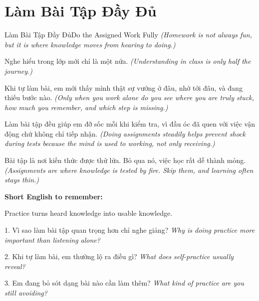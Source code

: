 \section{Làm Bài Tập Đầy Đủ}
\begin{truyen}{Làm Bài Tập Đầy Đủ}{Do the Assigned Work Fully}
\textit{(Homework is not always fun, but it is where knowledge moves from hearing to doing.)}

Nghe hiểu trong lớp mới chỉ là một nửa.
\textit{(Understanding in class is only half the journey.)}

Khi tự làm bài, em mới thấy mình thật sự vướng ở đâu, nhớ tới đâu, và đang thiếu bước nào.
\textit{(Only when you work alone do you see where you are truly stuck, how much you remember, and which step is missing.)}

Làm bài tập đều giúp em đỡ sốc mỗi khi kiểm tra, vì đầu óc đã quen với việc vận động chứ không chỉ tiếp nhận.
\textit{(Doing assignments steadily helps prevent shock during tests because the mind is used to working, not only receiving.)}
\end{truyen}

\begin{baihoc}
Bài tập là nơi kiến thức được thử lửa. Bỏ qua nó, việc học rất dễ thành mỏng.
\textit{(Assignments are where knowledge is tested by fire. Skip them, and learning often stays thin.)}
\end{baihoc}

\begin{ghinhoanh}
\textbf{Short English to remember:}

Practice turns heard knowledge into usable knowledge.

\end{ghinhoanh}

\begin{tuhocnhanh}
1. Vì sao làm bài tập quan trọng hơn chỉ nghe giảng? \textit{Why is doing practice more important than listening alone?}

2. Khi tự làm bài, em thường lộ ra điều gì? \textit{What does self-practice usually reveal?}

3. Em đang bỏ sót dạng bài nào cần làm thêm? \textit{What kind of practice are you still avoiding?}
\end{tuhocnhanh}
\ngancach

